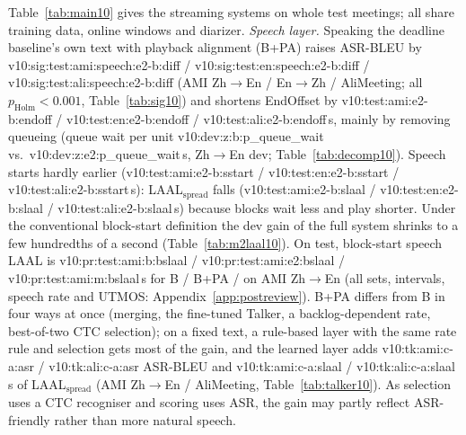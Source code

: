 Table~\ref{tab:main10} gives the streaming systems on whole test meetings; all share training data, online windows and
diarizer. \emph{Speech layer.} Speaking the deadline baseline's own text with playback alignment (B+PA) raises ASR-BLEU
by \num{v10:sig:test:ami:speech:e2-b:diff} / \num{v10:sig:test:en:speech:e2-b:diff} /
\num{v10:sig:test:ali:speech:e2-b:diff} (AMI Zh$\rightarrow$En / En$\rightarrow$Zh / AliMeeting; all
$p_\text{Holm}<0.001$, Table~\ref{tab:sig10}) and shortens EndOffset by \num{v10:test:ami:e2-b:endoff} /
\num{v10:test:en:e2-b:endoff} / \num{v10:test:ali:e2-b:endoff}\,s, mainly by removing queueing (queue wait per unit
\num{v10:dev:z:b:p_queue_wait} vs.\ \num{v10:dev:z:e2:p_queue_wait}\,s, Zh$\rightarrow$En dev; Table~\ref{tab:decomp10}).
Speech starts hardly earlier (\num{v10:test:ami:e2-b:sstart} / \num{v10:test:en:e2-b:sstart} /
\num{v10:test:ali:e2-b:sstart}\,s): LAAL$_\text{spread}$ falls (\num{v10:test:ami:e2-b:slaal} /
\num{v10:test:en:e2-b:slaal} / \num{v10:test:ali:e2-b:slaal}\,s) because blocks wait less and play shorter. Under the conventional
block-start definition the dev gain of the full system shrinks to a few hundredths of a second
(Table~\ref{tab:m2laal10}).
\ifPostReview
On test, block-start speech LAAL is \num{v10:pr:test:ami:b:bslaal} / \num{v10:pr:test:ami:e2:bslaal} /
\num{v10:pr:test:ami:m:bslaal}\,s for B / B+PA / \sys{} on AMI Zh$\rightarrow$En (all sets, intervals, speech rate and
UTMOS: Appendix~\ref{app:postreview}).
\fi
B+PA differs from B in four ways at once (merging, the fine-tuned Talker, a backlog-dependent rate, best-of-two
CTC selection); on a fixed text, a rule-based layer with the same rate rule and selection gets most of the gain, and the
learned layer adds \num{v10:tk:ami:c-a:asr} / \num{v10:tk:ali:c-a:asr} ASR-BLEU and
\num{v10:tk:ami:c-a:slaal} / \num{v10:tk:ali:c-a:slaal}\,s of LAAL$_\text{spread}$ (AMI Zh$\rightarrow$En / AliMeeting,
Table~\ref{tab:talker10}). As selection uses a CTC recogniser and
scoring uses ASR, the gain may partly reflect ASR-friendly rather than more natural speech.


